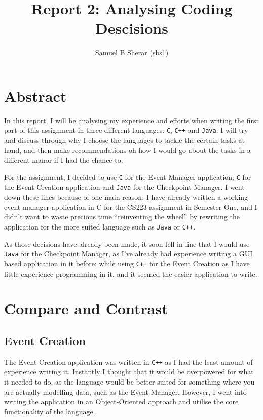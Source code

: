 \documentclass[a4paper]{article}
\begin{document}
\title{Report 2: Analysing Coding Descisions}
\author{Samuel B Sherar (sbs1)}

\maketitle
\newpage

\section*{Abstract}

In this report, I will be analysing my experience and efforts when writing the first part of this assignment in three different languages: \texttt{C}, \texttt{C++} and \texttt{Java}. I will try and discuss through why I choose the languages to tackle the certain tasks at hand, and then make recommendations oh how I would go about the tasks in a different manor if I had the chance to.

For the assignment, I decided to use \texttt{C} for the Event Manager application; \texttt{C} for the Event Creation application and \texttt{Java} for the Checkpoint Manager. I went down these lines because of one main reason: I have already written a working event manager application in C for the CS223 assignment in Semester One, and I didn't want to waste precious time ``reinventing the wheel'' by rewriting the application for the more suited language such as \texttt{Java} or \texttt{C++}.

As those decisions have already been made, it soon fell in line that I would use \texttt{Java} for the Checkpoint Manager, as I've already had experience writing a GUI based application in it before; while using \texttt{C++} for the Event Creation as I have little experience programming in it, and it seemed the easier application to write.


\section*{Compare and Contrast}

\subsection*{Event Creation}

The Event Creation application was written in \texttt{C++} as I had the least amount of experience writing it. Instantly I thought that it would be overpowered for what it needed to do, as the language would be better suited for something where you are actually modelling data, such as the Event Manager. However, I went into writing the application in an Object-Oriented approach and utilise the core functionality of the language.
\end{document}
